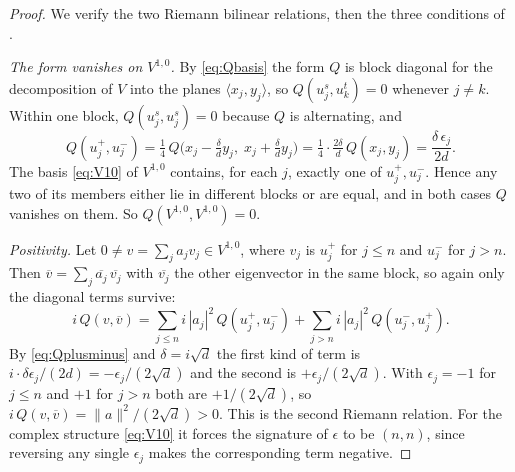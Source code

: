 \documentclass[11pt,reqno]{amsart}
\theoremstyle{plain}
\theoremstyle{definition}
\theoremstyle{remark}
\newcommand{\bbar}[1]{\overline{#1}}
\begin{document}
\begin{proof}
We verify the two Riemann bilinear relations, then the three conditions of
.

\emph{The form vanishes on $V^{1,0}$.} By \eqref{eq:Qbasis} the form $Q$ is
block diagonal for the decomposition of $V$ into the planes
$\langle x_{j},y_{j}\rangle$, so $Q(u_{j}^{s},u_{k}^{t})=0$ whenever $j\ne k$.
Within one block, $Q(u_{j}^{s},u_{j}^{s})=0$ because $Q$ is alternating, and
\begin{equation}\label{eq:Qplusminus}
  Q(u_{j}^{+},u_{j}^{-})
  =\tfrac14\,Q\bigl(x_{j}-\tfrac{\delta}{d}y_{j},\;
                    x_{j}+\tfrac{\delta}{d}y_{j}\bigr)
  =\tfrac14\cdot\tfrac{2\delta}{d}\,Q(x_{j},y_{j})
  =\frac{\delta\,\epsilon_{j}}{2d}.
\end{equation}
The basis \eqref{eq:V10} of $V^{1,0}$ contains, for each $j$, exactly one of
$u_{j}^{+},u_{j}^{-}$. Hence any two of its members either lie in different
blocks or are equal, and in both cases $Q$ vanishes on them. So
$Q(V^{1,0},V^{1,0})=0$.

\emph{Positivity.} Let $0\ne v=\sum_{j}a_{j}v_{j}\in V^{1,0}$, where $v_{j}$ is
$u_{j}^{+}$ for $j\le n$ and $u_{j}^{-}$ for $j>n$. Then
$\bbar{v}=\sum_{j}\bbar{a_{j}}\,\bbar{v_{j}}$ with $\bbar{v_{j}}$ the other
eigenvector in the same block, so again only the diagonal terms survive:
\[
  i\,Q(v,\bbar{v})
  =\sum_{j\le n}i\,|a_{j}|^{2}\,Q(u_{j}^{+},u_{j}^{-})
   +\sum_{j>n}i\,|a_{j}|^{2}\,Q(u_{j}^{-},u_{j}^{+}) .
\]
By \eqref{eq:Qplusminus} and $\delta=i\sqrt{d}$ the first kind of term is
$i\cdot\delta\epsilon_{j}/(2d)=-\epsilon_{j}/(2\sqrt{d})$ and the second is
$+\epsilon_{j}/(2\sqrt{d})$. With $\epsilon_{j}=-1$ for $j\le n$ and $+1$ for
$j>n$ both are $+1/(2\sqrt{d})$, so $i\,Q(v,\bbar{v})=\|a\|^{2}/(2\sqrt{d})>0$.
This is the second Riemann relation. For the complex structure
\eqref{eq:V10} it forces the signature of $\epsilon$ to be $(n,n)$, since
reversing any single $\epsilon_{j}$ makes the corresponding term negative.


\end{proof}
\end{document}
